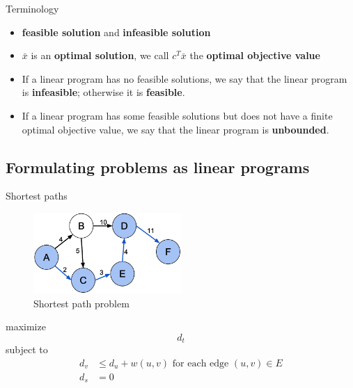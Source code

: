 \begin{frame}{Terminology}

    \begin{itemize}
        \item \textbf{feasible solution} and \textbf{infeasible solution}
        \item $\bar{x}$ is an \textbf{optimal solution}, 
        we call $c^T\bar{x}$ the \textbf{optimal objective value}
        \item If a linear program has no feasible solutions, we say that the linear 
        program is \textbf{infeasible}; otherwise it is \textbf{feasible}.
        \item If a linear program has some feasible solutions but does not have a finite 
        optimal objective value, we say that the linear program is \textbf{unbounded}.
    \end{itemize}

\end{frame}

\subsection{Formulating problems as linear programs}

\begin{frame}{Shortest paths}

    \begin{figure}
        \includegraphics[width=0.5\textwidth]{assets/shortest_path.png}
        \caption{Shortest path problem}
    \end{figure}

    maximize $$d_t$$
    subject to 
    \begin{align*}
        d_v &\le d_u + w(u,v) \text{ for each edge }(u,v)\in E\\
        d_s &= 0
    \end{align*}

\end{frame}

